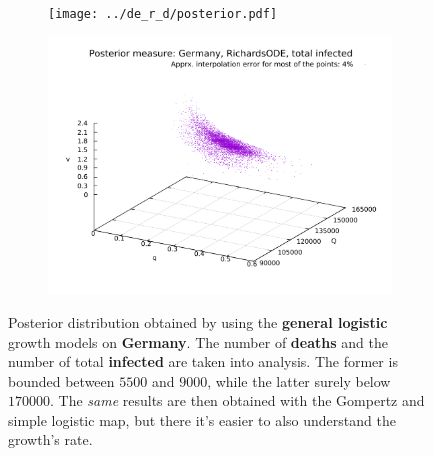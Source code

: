 \documentclass[8pt]{article}
\begin{document}
\begin{figure}[h!]
  \centering
  \begin{subfigure}[b]{0.45\linewidth}
  \texttt{[image: ../de\_r\_d/posterior.pdf]}
  \end{subfigure}
  \begin{subfigure}[b]{0.45\linewidth}
    \includegraphics[width=\linewidth]{../de_r_t/posterior.pdf}
  \end{subfigure}
	\caption{Posterior distribution obtained by using the
	\textbf{general logistic} growth models on \textbf{Germany}. 
	The number of \textbf{deaths}
	and the number of total \textbf{infected} are taken into analysis.
	The former is bounded between $5500$ and
	$9000$, while the latter surely below $170000$. The \emph{same}
	results are then obtained with the Gompertz and simple logistic map,
	but there it's easier to also understand the growth's rate.}	
\end{figure}
\end{document}
